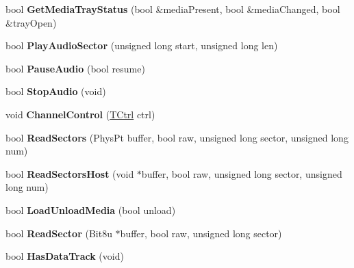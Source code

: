 \begin{DoxyCompactItemize}
\item 
\hypertarget{classCDROM__Interface__Image_a8c5afdabeea94743f487fae4623eacac}{bool {\bfseries Get\-Media\-Tray\-Status} (bool \&media\-Present, bool \&media\-Changed, bool \&tray\-Open)}\label{classCDROM__Interface__Image_a8c5afdabeea94743f487fae4623eacac}

\item 
\hypertarget{classCDROM__Interface__Image_afbb8b5443be56ba92b5a1287ba95f913}{bool {\bfseries Play\-Audio\-Sector} (unsigned long start, unsigned long len)}\label{classCDROM__Interface__Image_afbb8b5443be56ba92b5a1287ba95f913}

\item 
\hypertarget{classCDROM__Interface__Image_ac74be8f64002ccf76b65c2fbd03077bd}{bool {\bfseries Pause\-Audio} (bool resume)}\label{classCDROM__Interface__Image_ac74be8f64002ccf76b65c2fbd03077bd}

\item 
\hypertarget{classCDROM__Interface__Image_a4a0af2e1be4fcb87e125b9d3e7aca327}{bool {\bfseries Stop\-Audio} (void)}\label{classCDROM__Interface__Image_a4a0af2e1be4fcb87e125b9d3e7aca327}

\item 
\hypertarget{classCDROM__Interface__Image_a6759cd7741be28cb61dd9903712edca1}{void {\bfseries Channel\-Control} (\hyperlink{structSCtrl}{T\-Ctrl} ctrl)}\label{classCDROM__Interface__Image_a6759cd7741be28cb61dd9903712edca1}

\item 
\hypertarget{classCDROM__Interface__Image_a5121d2e82267d529bc462cecdac36791}{bool {\bfseries Read\-Sectors} (Phys\-Pt buffer, bool raw, unsigned long sector, unsigned long num)}\label{classCDROM__Interface__Image_a5121d2e82267d529bc462cecdac36791}

\item 
\hypertarget{classCDROM__Interface__Image_ae686caa17e265089d6cd1a69ecc5b332}{bool {\bfseries Read\-Sectors\-Host} (void $\ast$buffer, bool raw, unsigned long sector, unsigned long num)}\label{classCDROM__Interface__Image_ae686caa17e265089d6cd1a69ecc5b332}

\item 
\hypertarget{classCDROM__Interface__Image_af5aa7f94de1d7c77ff6b484b380c5351}{bool {\bfseries Load\-Unload\-Media} (bool unload)}\label{classCDROM__Interface__Image_af5aa7f94de1d7c77ff6b484b380c5351}

\item 
\hypertarget{classCDROM__Interface__Image_acbed60c6b06009b2a027d605190ee842}{bool {\bfseries Read\-Sector} (Bit8u $\ast$buffer, bool raw, unsigned long sector)}\label{classCDROM__Interface__Image_acbed60c6b06009b2a027d605190ee842}

\item 
\hypertarget{classCDROM__Interface__Image_a7348536d197510d1442419f2aa172ccc}{bool {\bfseries Has\-Data\-Track} (void)}\label{classCDROM__Interface__Image_a7348536d197510d1442419f2aa172ccc}

\end{DoxyCompactItemize}
